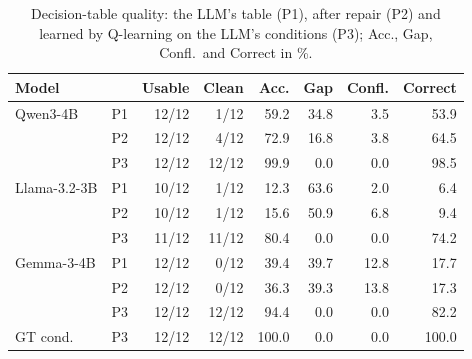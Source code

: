 \begin{table}[t]
\centering
\caption{Decision-table quality: the LLM's table (P1), after repair (P2) and learned by Q-learning on the LLM's conditions (P3); Acc., Gap, Confl.\ and Correct in \%.}
\label{tab:tables}
\footnotesize
\setlength{\tabcolsep}{3.4pt}
\begin{tabular}{@{}llrrrrrr@{}}
\toprule
Model & & Usable & Clean & Acc. & Gap & Confl. & Correct \\
\midrule
Qwen3-4B & P1 & 12/12 & 1/12 & 59.2 & 34.8 & 3.5 & 53.9 \\
 & P2 & 12/12 & 4/12 & 72.9 & 16.8 & 3.8 & 64.5 \\
 & P3 & 12/12 & 12/12 & 99.9 & 0.0 & 0.0 & 98.5 \\
Llama-3.2-3B & P1 & 10/12 & 1/12 & 12.3 & 63.6 & 2.0 & 6.4 \\
 & P2 & 10/12 & 1/12 & 15.6 & 50.9 & 6.8 & 9.4 \\
 & P3 & 11/12 & 11/12 & 80.4 & 0.0 & 0.0 & 74.2 \\
Gemma-3-4B & P1 & 12/12 & 0/12 & 39.4 & 39.7 & 12.8 & 17.7 \\
 & P2 & 12/12 & 0/12 & 36.3 & 39.3 & 13.8 & 17.3 \\
 & P3 & 12/12 & 12/12 & 94.4 & 0.0 & 0.0 & 82.2 \\
\addlinespace
GT cond. & P3 & 12/12 & 12/12 & 100.0 & 0.0 & 0.0 & 100.0 \\
\bottomrule
\end{tabular}
\end{table}
